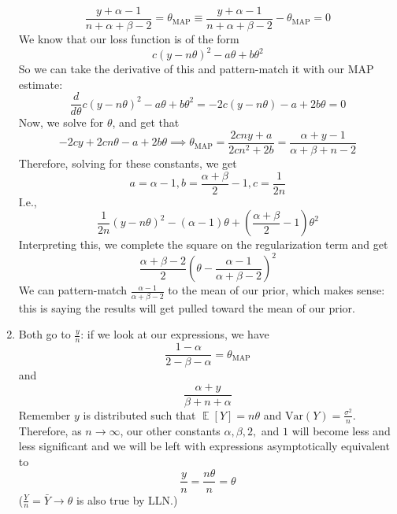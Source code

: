 \documentclass[submit]{harvardml}
\newenvironment{ans}{
  \begin{enumerate}
  \color{blue}
}{
  \end{enumerate}
  \color{black}
}
\DeclareMathOperator*{\mean}{\mathbb{E}}
\begin{document}
\begin{ans}
\begin{enumerate}
    $$
    \frac{y + \alpha - 1}{n + \alpha + \beta - 2} = \theta_{\text{MAP}} \equiv \frac{y + \alpha - 1}{n + \alpha + \beta - 2} - \theta_{\text{MAP}} = 0
    $$
    We know that our loss function is of the form 
    $$
    c(y - n\theta)^2 - a\theta + b\theta^2
    $$
    So we can take the derivative of this and pattern-match it with our MAP estimate:
    $$
    \frac{d}{d\theta} c(y - n\theta)^2 - a\theta + b\theta^2 = -2c(y - n\theta) - a + 2b\theta  = 0
    $$
    Now, we solve for $\theta$, and get that
    $$
    -2cy + 2cn\theta - a + 2b\theta \implies \theta_{\text{MAP}} = \frac{2cny + a}{2cn^2 + 2b} = \frac{\alpha + y - 1}{\alpha + \beta + n - 2}
    $$
    Therefore, solving for these constants, we get 
    $$
    a = \alpha - 1, b = \frac{\alpha + \beta}{2} - 1, c = \frac{1}{2n}
    $$
    I.e., 
    $$
    \frac{1}{2n}(y - n\theta)^2 - (\alpha - 1)\theta + (\frac{\alpha + \beta}{2} - 1)\theta^2
    $$
    Interpreting this, we complete the square on the regularization term and get 
    $$
    \frac{\alpha + \beta - 2}{2}\left(\theta - \frac{\alpha - 1}{\alpha + \beta - 2}\right)^2
    $$
    We can pattern-match $\frac{\alpha - 1}{\alpha + \beta - 2}$ to the mean of our prior, which makes sense: this is saying the results will get pulled toward the mean of our prior. 
    \item Both go to $\frac{y}{n}$: if we look at our expressions, we have 
    $$
    \frac{1-\alpha}{2 - \beta - \alpha} = \theta_{\text{MAP}}
    $$
    and 
    $$
    \frac{\alpha + y}{\beta + n + \alpha}
    $$
    Remember $y$ is distributed such that $\mean [Y] = n \theta$ and $\text{Var}(Y)=\frac{\sigma^2}{n}$. Therefore, as $n \to \infty$, our other constants $\alpha, \beta, 2,$ and $1$ will become less and less significant and we will be left with expressions asymptotically equivalent to 
    $$
    \frac{y}{n} = \frac{n\theta}{n} = \theta
    $$
    ($\frac{Y}{n} = \bar Y \to \theta$ is also true by LLN.)
    \end{enumerate}
    \end{ans}
\newpage


\newpage

\end{document}
